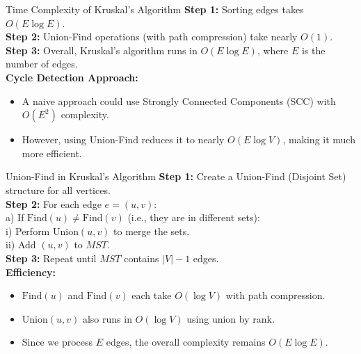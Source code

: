 \begin{frame}{Time Complexity of Kruskal's Algorithm}
    \textbf{Step 1:} Sorting edges takes \( O(E \log E) \). \\
    \textbf{Step 2:} Union-Find operations (with path compression) take nearly \( O(1) \). \\
    \textbf{Step 3:} Overall, Kruskal's algorithm runs in \( O(E \log E) \), where \( E \) is the number of edges. \\

    \vspace{0.5cm}
    \textbf{Cycle Detection Approach:}
    \begin{itemize}
        \item A naive approach could use Strongly Connected Components (SCC) with \( O(E^2) \) complexity.
        \item However, using Union-Find reduces it to nearly \( O(E \log V) \), making it much more efficient.
    \end{itemize}
\end{frame}


\begin{frame}{Union-Find in Kruskal's Algorithm}
    \textbf{Step 1:} Create a Union-Find (Disjoint Set) structure for all vertices. \\
    \textbf{Step 2:} For each edge \( e = (u, v) \): \\
    \hspace{1cm} a) If \( \text{Find}(u) \neq \text{Find}(v) \) (i.e., they are in different sets): \\
    \hspace{2cm} i) Perform \( \text{Union}(u, v) \) to merge the sets. \\
    \hspace{2cm} ii) Add \( (u, v) \) to \( MST \). \\
    \textbf{Step 3:} Repeat until \( MST \) contains \( |V| - 1 \) edges. \\

    \vspace{0.5cm}
    \textbf{Efficiency:}
    \begin{itemize}
        \item \( \text{Find}(u) \) and \( \text{Find}(v) \) each take \( O(\log V) \) with path compression.
        \item \( \text{Union}(u, v) \) also runs in \( O(\log V) \) using union by rank.
        \item Since we process \( E \) edges, the overall complexity remains \( O(E \log E) \).
    \end{itemize}
\end{frame}


